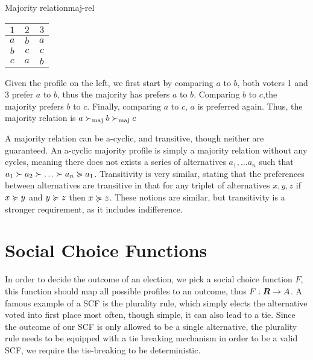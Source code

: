 \begin{example}{Majority relation}{maj-rel}
	\begin{minipage}{0.15\linewidth}
		\begin{tabular}{ccc}
			\toprule
			$1$ & $2$ & $3$ \\
			\midrule
			$a$ & $b$ & $a$ \\
			$b$ & $c$ & $c$ \\
			$c$ & $a$ & $b$ \\
			\bottomrule
		\end{tabular}
	\end{minipage}
	\hspace{0.02\linewidth}
	\begin{minipage}{0.78\linewidth}
		Given the profile on the left, we first start by comparing $a$ to $b$, both voters 1 and 3 prefer $a$ to $b$, thus the majority has prefers $a$ to $b$. Comparing $b$ to $c$,the majority prefers $b$ to $c$. Finally, comparing $a$ to $c$, $a$ is preferred again. Thus, the majority relation is $a \succ_{\textnormal{maj}} b \succ_{\textnormal{maj}} c$
	\end{minipage}
\end{example}

A majority relation can be a-cyclic, and transitive, though neither are guaranteed. An a-cyclic majority profile is simply a majority relation without any cycles, meaning there does not exists a series of alternatives $a_1, \dots a_n$ such that $a_1 \pref a_2 \pref \dots \pref a_n  \prefeq a_1$. Transitivity is very similar, stating that the preferences between alternatives are transitive in that for any triplet of alternatives $x,y,z$ if $x \succcurlyeq y$ and $y \succcurlyeq z$ then $x \succcurlyeq z$. These notions are similar, but transitivity is a stronger requirement, as it includes indifference.


\section{Social Choice Functions}
\label{sec:SCF}
In order to decide the outcome of an election, we pick a social choice function $F$, this function should map all possible profiles to an outcome, thus $F: \boldsymbol{R} \to A$. A famous example of a SCF is the plurality rule, which simply elects the alternative voted into first place most often, though simple, it can also lead to a tie. Since the outcome of our SCF is only allowed to be a single alternative, the plurality rule needs to be equipped with a tie breaking mechanism in order to be a valid SCF, we require the tie-breaking to be deterministic.


